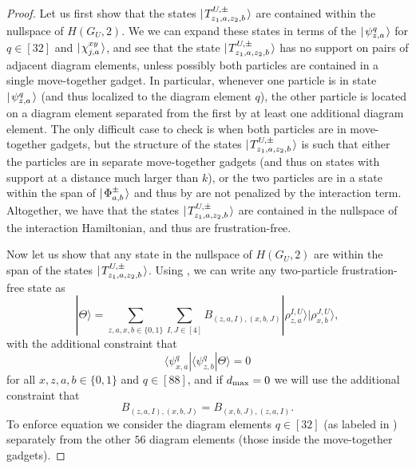 \documentclass[../thesis-main/thesis-main]{subfiles}
\begin{document}
\begin{proof}

Let us first show that the states $|\mspace{2mu} T_{z_1,a,z_2,b}^{U,\pm} \mspace{2mu} \rangle$ are contained within the nullspace of $H(G_U,2)$.   We we can expand these states in terms of the $|\mspace{2mu} \psi^q_{z,a} \mspace{2mu} \rangle$ for $q\in[32]$ and $|\mspace{2mu} \chi_{j,a}^{xy} \mspace{2mu} \rangle$, and see that the state $|\mspace{2mu} T_{z_1,a,z_2,b}^{U,\pm} \mspace{2mu} \rangle$ has no support on pairs of adjacent diagram elements, unless possibly both particles are contained in a single move-together gadget.   In particular, whenever one particle is in state $|\mspace{2mu} \psi^q_{z,a} \mspace{2mu} \rangle$ (and thus localized to the diagram element $q$), the other particle is located on a diagram element separated from the first by at least one additional diagram element.  The only difficult case to check is when both particles are in move-together gadgets, but the structure of the states $|\mspace{2mu} T_{z_1,a,z_2,b}^{U,\pm} \mspace{2mu} \rangle$ is such that either the particles are in separate move-together gadgets (and thus on states with support at a distance much larger than $k$), or the two particles are in a state within the span of $|\mspace{2mu} \Phi_{a,b}^{\pm} \mspace{2mu} \rangle$ and thus by  are not penalized by the interaction term.  Altogether, we have that the states $|\mspace{2mu} T_{z_1,a,z_2,b}^{U,\pm} \mspace{2mu} \rangle$ are contained in the nullspace of the interaction Hamiltonian, and thus are frustration-free.

Now let us show that any state in the nullspace of $H(G_U,2)$ are within the span of the states $|\mspace{2mu} T_{z_1,a,z_2,b}^{U,\pm} \mspace{2mu} \rangle$. Using , we can write any two-particle frustration-free state as 
\begin{equation}
  |\Theta\rangle=\sum_{z,a,x,b\in \{0,1\}}\sum_{I,J\in [4]}B_{\left(z,a,I\right),\left(x,b,J\right)}|\rho_{z,a}^{I,U}\rangle|\rho_{x,b}^{J,U}\rangle
\label{eq:thetastate},
\end{equation}
with the additional constraint that 
\begin{equation}
\langle\psi_{x,a}^{q}|\langle\psi_{z,b}^{q}|\Theta\rangle=0\label{eq:ff_condition}
\end{equation}
for all $x,z,a,b\in\{0,1\}$ and $q\in[88]$, and if $d_{\text{max}} = 0$ we will use the additional constraint that 
\begin{equation}
B_{\left(z,a,I\right),\left(x,b,J\right)}=B_{\left(x,b,J\right),\left(z,a,I\right)}. \label{eq:sym_B}
\end{equation}
 To enforce equation  we consider the diagram elements $q\in [32]$ (as labeled in ) separately from the other $56$ diagram elements (those inside the move-together gadgets). 


\end{proof}
\end{document}
